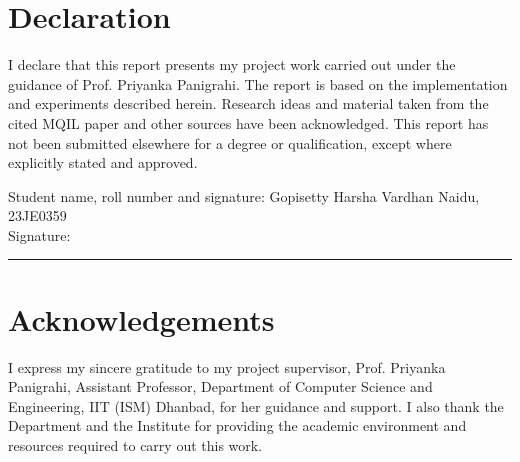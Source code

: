 \documentclass[12pt,a4paper,oneside]{report}
\begin{document}
\chapter*{Declaration}
I declare that this report presents my project work carried out under the guidance of Prof. Priyanka Panigrahi. The report is based on the implementation and experiments described herein. Research ideas and material taken from the cited MQIL paper and other sources have been acknowledged. This report has not been submitted elsewhere for a degree or qualification, except where explicitly stated and approved.

\vspace{0.8cm}
Student name, roll number and signature: Gopisetty Harsha Vardhan Naidu, 23JE0359\\[0.8cm]
Signature: \rule{5cm}{0.4pt}

\chapter*{Acknowledgements}
I express my sincere gratitude to my project supervisor, Prof. Priyanka Panigrahi, Assistant Professor, Department of Computer Science and Engineering, IIT (ISM) Dhanbad, for her guidance and support. I also thank the Department and the Institute for providing the academic environment and resources required to carry out this work.
\end{document}
